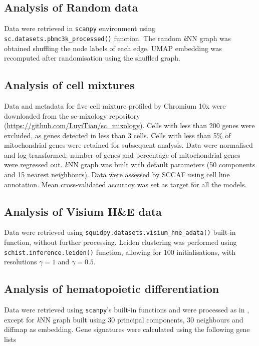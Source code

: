 \documentclass[10pt]{article}
\begin{document}
\subsection*{Analysis of Random data}

Data were retrieved in \texttt{scanpy} environment using \texttt{sc.datasets.pbmc3k\_processed()} function. The random \emph{k}NN graph was obtained shuffling the node labels of each edge. UMAP embedding was recomputed after randomisation using the shuffled graph.

\subsection*{Analysis of cell mixtures}

Data and metadata for five cell mixture profiled by Chromium 10x were downloaded from the sc-mixology repository (\href{https://github.com/LuyiTian/sc_mixology}{https:/\slash github.com\slash LuyiTian\slash sc\_mixology}). Cells with less than 200 genes were excluded, as genes detected in less than 3 cells. Cells with less than 5\% of mitochondrial genes were retained for subsequent analysis. Data were normalised and log-transformed; number of genes and percentage of mitochondrial genes were regressed out. \emph{k}NN graph was built with default parameters (50 components and 15 nearest neighbours). Data were assessed by SCCAF using cell line annotation. Mean cross-validated accuracy was set as target for all the models.

\subsection*{Analysis of Visium H\&E data}
Data were retrieved using \texttt{squidpy.datasets.visium\_hne\_adata()} built-in function, without further processing. Leiden clustering was performed using \texttt{schist.inference.leiden()} function, allowing for 100 initialisations, with resolutions $\gamma = 1$ and $\gamma = 0.5$. 

\subsection*{Analysis of hematopoietic differentiation}

Data were retrieved using \texttt{scanpy}'s built-in functions and were processed as in \cite{wolf_2019}, except for \emph{k}NN graph built using 30 principal components, 30 neighbours and diffmap as embedding. Gene signatures were calculated using the following gene lists
\end{document}
